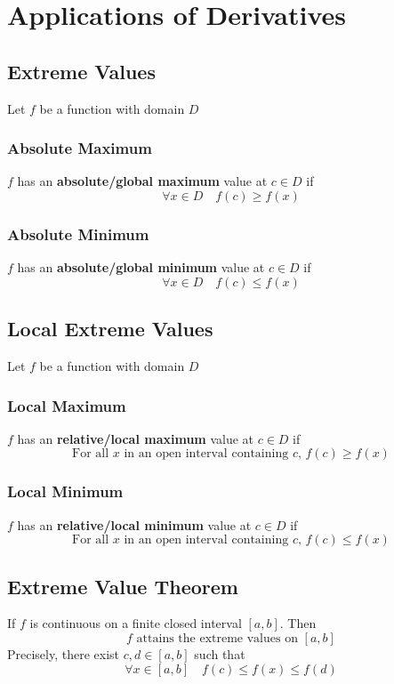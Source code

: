\documentclass[../ma2002_notes.tex]{subfiles}
\begin{document}
\section{Applications of Derivatives}
\subsection{Extreme Values}
Let \(f\) be a function with domain \(D\)
\subsubsection{Absolute Maximum}
\(f\) has an \textbf{absolute/global maximum} value at \(c\in D\) if
\[\forall x\in D\quad f(c)\geq f(x)\]
\subsubsection{Absolute Minimum}
\(f\) has an \textbf{absolute/global minimum} value at \(c\in D\) if
\[\forall x\in D\quad f(c)\leq f(x)\]

\subsection{Local Extreme Values}
Let \(f\) be a function with domain \(D\)
\subsubsection{Local Maximum}
\(f\) has an \textbf{relative/local maximum} value at \(c\in D\) if
\[\text{For all }x\text{ in an open interval containing }c,\,f(c)\geq f(x)\]
\subsubsection{Local Minimum}
\(f\) has an \textbf{relative/local minimum} value at \(c\in D\) if
\[\text{For all }x\text{ in an open interval containing }c,\,f(c)\leq f(x)\]

\subsection{Extreme Value Theorem}
If \(f\) is continuous on a finite closed interval \([a,b]\). Then
\[f\text{ attains the extreme values on }[a,b]\]
Precisely, there exist \(c,d\in[a,b]\) such that
\[\forall x\in[a,b]\quad f(c)\leq f(x)\leq f(d)\]
\end{document}
